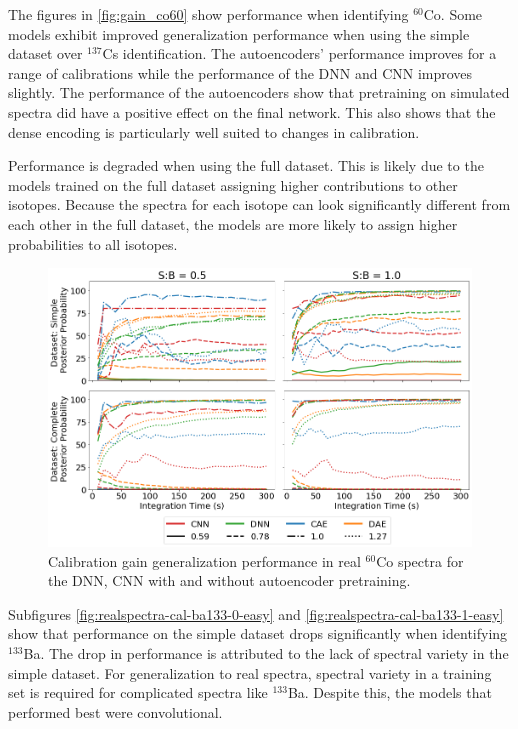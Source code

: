 The figures in \ref{fig:gain_co60} show performance when identifying $^{60}$Co. Some models exhibit improved generalization performance when using the simple dataset over $^{137}$Cs identification. The autoencoders' performance improves for a range of calibrations while the performance of the DNN and CNN improves slightly. The performance of the autoencoders show that pretraining on simulated spectra did have a positive effect on the final network. This also shows that the dense encoding is particularly well suited to changes in calibration.

Performance is degraded when using the full dataset. This is likely due to the models trained on the full dataset assigning higher contributions to other isotopes. Because the spectra for each isotope can look significantly different from each other in the full dataset, the models are more likely to assign higher probabilities to all isotopes.

\begin{figure}[H]
	\centering
	\includegraphics[width=1.0\linewidth]{images/realspectra-cal-co60}
	\caption{Calibration gain generalization performance in real $^{60}$Co spectra for the DNN, CNN with and without autoencoder pretraining.}
	\label{fig:realspectra-cal-co60}
\end{figure}

Subfigures \ref{fig:realspectra-cal-ba133-0-easy} and \ref{fig:realspectra-cal-ba133-1-easy} show that performance on the simple dataset drops significantly when identifying $^{133}$Ba. The drop in performance is attributed to the lack of spectral variety in the simple dataset. For generalization to real spectra, spectral variety in a training set is required for complicated spectra like $^{133}$Ba. Despite this, the models that performed best were convolutional.

